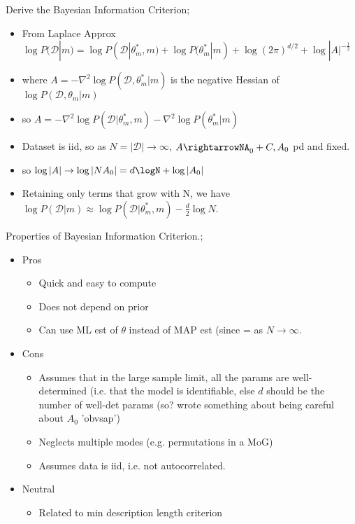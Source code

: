 \documentclass{article}
\begin{document}
Derive the Bayesian Information Criterion; \begin{itemize}
    \item From Laplace Approx 
    $\log P(\mathcal{D}|m)=\log P(\mathcal{D}|\theta^*_m, m) + \log P(\theta^*_m|m) + \log (2\pi)^{d/2} + \log|A|^{-\frac{1}{2}}$
    \item where $A=-\nabla^2\log P(\mathcal{D},\theta^*_m|m)$ is the negative Hessian of $\log P(\mathcal{D},\theta_m|m)$
    \item so $A=-\nabla^2\log P(\mathcal{D}|\theta^*_m,m) -\nabla^2\log P(\theta^*_m|m)$
    \item Dataset is iid, so as $N=|\mathcal{D}|\rightarrow\infty$, $A\rightarrowNA_0+C, A_0$ pd and fixed.
    \item so $\log|A|\rightarrow\log|NA_0|=d\logN+\log|A_0|$
    \item Retaining only terms that grow with N, we have $\log P(\mathcal{D}|m)\approx \log P(\mathcal{D}|\theta^*_m, m)-\frac{d}{2}\log N$.
\end{itemize}

Properties of Bayesian Information Criterion.; \begin{itemize}
    \item Pros
    \begin{itemize}
        \item Quick and easy to compute
    \item Does not depend on prior
    \item Can use ML est of $\theta$ instead of MAP est (since = as $N\rightarrow\infty$.
    \end{itemize}
    \item Cons \begin{itemize}
        \item Assumes that in the large sample limit, all the params are well-determined (i.e. that the model is identifiable, else $d$ should be the number of well-det params (so? wrote something about being careful about $A_0$ 'obvsap')
        \item Neglects multiple modes (e.g. permutations in a MoG)
        \item Assumes data is iid, i.e. not autocorrelated.
    \end{itemize}
    \item Neutral
    \begin{itemize}
        \item Related to min description length criterion
    \end{itemize}
\end{itemize}
\end{document}

